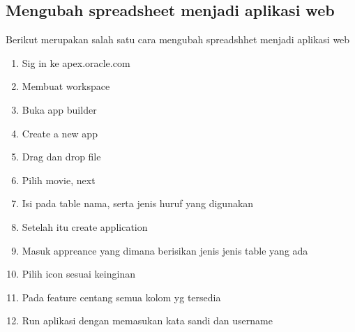 \documentclass{article}
\begin{document}
\subsection{Mengubah spreadsheet menjadi aplikasi web}
Berikut merupakan salah satu cara mengubah spreadshhet menjadi aplikasi web
\begin{enumerate}
    \item Sig in ke apex.oracle.com
    \item Membuat workspace
    \item Buka app builder
    \item Create a new app
    \item Drag dan drop file
    \item Pilih movie, next
    \item Isi pada table nama, serta jenis huruf yang digunakan
    \item Setelah itu create application
    \item Masuk appreance yang dimana berisikan jenis jenis table yang ada
    \item Pilih icon sesuai keinginan
    \item Pada feature centang semua kolom yg tersedia
    \item Run aplikasi dengan memasukan kata sandi dan username
\end{enumerate}
\end{document}
